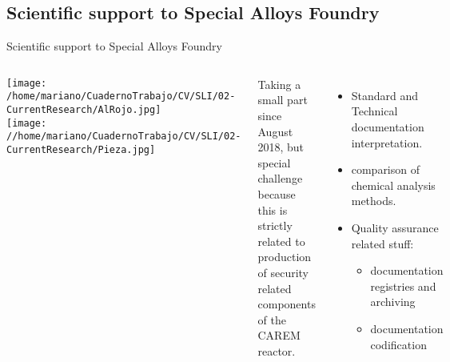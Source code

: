 \subsection{Scientific support to Special Alloys Foundry}

\begin{frame}{Scientific support to Special Alloys Foundry}
  \begin{columns}

    \texttt{[image: /home/mariano/CuadernoTrabajo/CV/SLI/02-CurrentResearch/AlRojo.jpg]}
    \\
    \texttt{[image: //home/mariano/CuadernoTrabajo/CV/SLI/02-CurrentResearch/Pieza.jpg]}

  Taking a small part since August 2018, but special challenge because this is 
  strictly related to production of security related components of the CAREM 
  reactor. 

  \begin{itemize}
    \item Standard and Technical documentation interpretation.
    \item comparison of chemical analysis methods.
    \item Quality assurance related stuff: 
      \begin{itemize}
	  \item documentation registries and archiving
	    \item documentation codification
      \end{itemize} 
  \end{itemize}

  \end{columns}

\end{frame}

